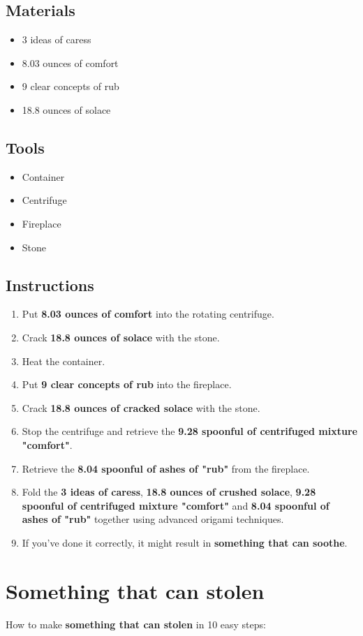 \documentclass{article}
\begin{document}
\subsection{Materials}\begin{itemize}
\item 
3 ideas of caress
\item 
8.03 ounces of comfort
\item 
9 clear concepts of rub
\item 
18.8 ounces of solace
\end{itemize}
\subsection{Tools}\begin{itemize}
\item 
Container
\item 
Centrifuge
\item 
Fireplace
\item 
Stone
\end{itemize}
\subsection{Instructions}\begin{enumerate}
\item 
Put \textbf{8.03 ounces of comfort} into the rotating centrifuge.
\item 
Crack \textbf{18.8 ounces of solace} with the stone.
\item 
Heat the container.
\item 
Put \textbf{9 clear concepts of rub} into the fireplace.
\item 
Crack \textbf{18.8 ounces of cracked solace} with the stone.
\item 
Stop the centrifuge and retrieve the \textbf{9.28 spoonful of centrifuged mixture "comfort"}.
\item 
Retrieve the \textbf{8.04 spoonful of ashes of "rub"} from the fireplace.
\item 
Fold the \textbf{3 ideas of caress}, \textbf{18.8 ounces of crushed solace}, \textbf{9.28 spoonful of centrifuged mixture "comfort"} and \textbf{8.04 spoonful of ashes of "rub"} together using advanced origami techniques.
\item 
If you've done it correctly, it might result in \textbf{something that can soothe}.
\end{enumerate}
\newpage
\section{Something that can stolen}How to make \textbf{something that can stolen} in 10 easy steps:
\end{document}
